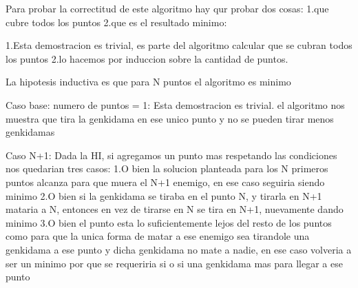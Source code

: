 Para probar la correctitud de este algoritmo hay qur probar dos cosas:
1.que cubre todos los puntos
2.que es el resultado minimo:


1.Esta demostracion es trivial, es parte del algoritmo  calcular que se cubran todos los puntos
2.lo hacemos por induccion sobre la cantidad de puntos.

La hipotesis inductiva es que para N puntos el algoritmo es minimo

Caso base:
numero de puntos = 1:
Esta demostracion es trivial. el algoritmo nos muestra que tira la genkidama en ese unico punto y no se pueden tirar menos genkidamas

Caso N+1:
Dada  la HI, si agregamos un punto mas respetando las condiciones nos quedarian tres casos:
1.O bien la solucion planteada para los N primeros puntos alcanza para que muera el N+1 enemigo, en ese caso seguiria siendo minimo
2.O bien si la genkidama se tiraba en el punto N, y tirarla en N+1 mataria a N, entonces  en vez de tirarse en N se tira en N+1, nuevamente dando minimo
3.O bien el punto esta lo suficientemente lejos del resto de los puntos como para que la unica forma de matar a ese enemigo sea tirandole una genkidama a ese punto y dicha genkidama no mate a nadie, en ese caso volveria a ser un minimo por que se requeriria si o si una genkidama mas para llegar a ese punto